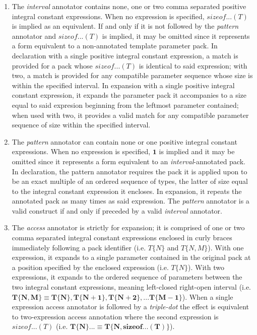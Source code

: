 \begin{enumerate}
\item\p The \textit{interval} annotator contains none, one or two comma separated positive integral constant expressions.
When no expression is specified, $sizeof...(T)$ is implied as an equivalent.
If and only if it is not followed by the \textit{pattern} annotator and $sizeof...(T)$ is implied, it may be omitted since it represents a form equivalent to a non-annotated template parameter pack.
In declaration with a single positive integral constant expression, a match is provided for a pack whose $sizeof...(T)$ is identical to said expression; with two, a match is provided for any compatible parameter sequence whose size is within the specified interval.
In expansion with a single positive integral constant expression, it expands the parameter pack it accompanies to a size equal to said expresion beginning from the leftmost parameter contained;
when used with two, it provides a valid match for any compatible parameter sequence of size within the specified interval.

\item\p The \textit{pattern} annotator can contain none or one positive integral constant expressions.
When no expression is specified, $\bm{1}$ is implied and it may be omitted since it represents a form equivalent to an \textit{interval}-annotated pack.
In declaration, the pattern annotator requires the pack it is applied upon to be an exact multiple of an ordered sequence of types, the latter of size equal to the integral constant expression it encloses. In expansion, it repeats the annotated pack as many times as said expression.
The \textit{pattern} annotator is a valid construct if and only if preceded by a valid \textit{interval} annotator.

\item\p The \textit{access} annotator is strictly for expansion; it is comprised of one or two comma separated integral constant expressions enclosed in curly braces immediately following a pack identifier (i.e. $T\{N\}$ and $T\{N,M\}$).
With one expression, it expands to a single parameter contained in the original pack at a position specified by the enclosed expression (i.e. $T\{N\}$).
With two expressions, it expands to the ordered sequence of parameters between the two integral constant expressions, meaning left-closed right-open interval (i.e. $\bm{T\{N,M\} \equiv T\{N\},T\{N+1\},T\{N+2\},...T\{M-1\}}$).
When a single expression access annotator is followed by a \textit{triple-dot} the effect is equivalent to two-expression access annotation where the second expression is $sizeof...(T)$ (i.e. $\bm{T\{N\}... \equiv T\{N,sizeof...(T)\}}$).
\end{enumerate}

